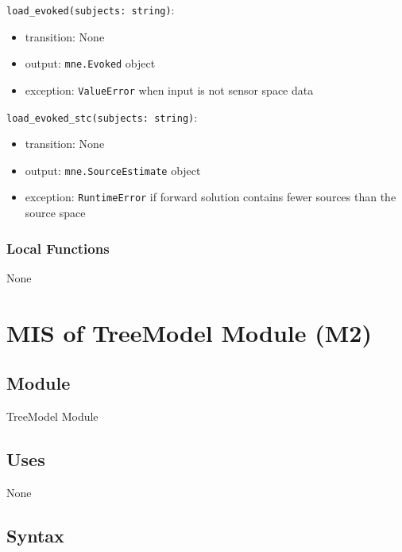 \documentclass[12pt, titlepage]{article}
\begin{document}
\noindent \lstinline|load_evoked(subjects: string)|:
\begin{itemize}
    \item transition: None
    \item output: \lstinline|mne.Evoked| object
    \item exception: \lstinline|ValueError| when input is not sensor space data
\end{itemize}


\noindent \lstinline|load_evoked_stc(subjects: string)|:
\begin{itemize}
    \item transition: None
    \item output: \lstinline|mne.SourceEstimate| object
    \item exception: \lstinline|RuntimeError| if forward solution contains fewer sources than the source space
\end{itemize}




\subsubsection{Local Functions}


None


\newpage








\section{MIS of TreeModel Module (M2)}




\subsection{Module}


TreeModel Module




\subsection{Uses}


None




\subsection{Syntax}
\end{document}
